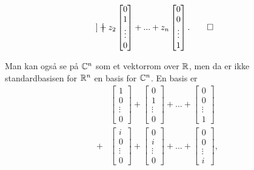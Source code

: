 \begin{ex}
\begin{align*}
\begin{bmatrix}
\end{bmatrix}
+
z_2
\begin{bmatrix}
0    \\ 1  \\ \vdots \\ 0
\end{bmatrix}
+...+
z_n
\begin{bmatrix}
0    \\ 0  \\ \vdots \\ 1
\end{bmatrix}. \qedhere
\end{align*}
\end{ex}

\begin{ex}
Man kan også se på $\mathbb{C}^n$ som et vektorrom over $\mathbb{R}$, men da er ikke standardbasisen for $\mathbb{R}^n$ en basis for $\mathbb{C}^n$. En basis er
\begin{align*}
&
\begin{bmatrix}
1    \\ 0  \\ \vdots \\ 0
\end{bmatrix}
+
\begin{bmatrix}
0    \\ 1  \\ \vdots \\ 0
\end{bmatrix}
+...+
\begin{bmatrix}
0    \\ 0  \\ \vdots \\ 1
\end{bmatrix}
\\ +
&
\begin{bmatrix}
i    \\ 0  \\ \vdots \\ 0
\end{bmatrix}
+
\begin{bmatrix}
0    \\ i  \\ \vdots \\ 0
\end{bmatrix}
+...+
\begin{bmatrix}
0    \\ 0  \\ \vdots \\ i
\end{bmatrix},
\end{align*}

\end{ex}
